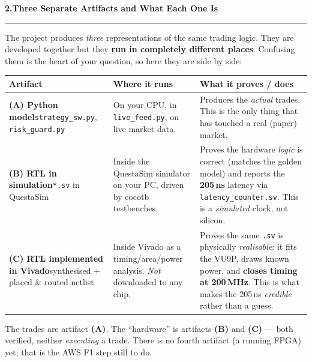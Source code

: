 \documentclass[10pt,a4paper]{article}
\newcommand{\sectionrule}{\par\nobreak\vspace{1pt}\textcolor{rulegray}{\rule{\linewidth}{0.8pt}}\par\vspace{1pt}}
\newcommand{\fpath}[1]{\texttt{\textcolor{hdrblue}{#1}}}
\begin{document}
{\large\bfseries\color{hdrblue} 2.\quad Three Separate Artifacts \textendash{} and What Each One Is}
\sectionrule

The project produces \emph{three} representations of the same trading logic. They
are developed together but they \textbf{run in completely different places}.
Confusing them is the heart of your question, so here they are side by side:

\begin{center}\small
\renewcommand{\arraystretch}{1.3}
\begin{tabularx}{\linewidth}{@{}>{\raggedright\arraybackslash}p{3.0cm} X X@{}}
\toprule
\textbf{Artifact} & \textbf{Where it runs} & \textbf{What it proves / does} \\
\midrule
\textbf{(A) Python model}\newline \fpath{strategy\_sw.py}, \fpath{risk\_guard.py}
  & On your CPU, in \fpath{live\_feed.py}, on live market data.
  & Produces the \emph{actual} trades. This is the only thing that has touched a real (paper) market. \\
\textbf{(B) RTL in simulation}\newline \fpath{*.sv} in QuestaSim
  & Inside the QuestaSim simulator on your PC, driven by cocotb testbenches.
  & Proves the hardware \emph{logic} is correct (matches the golden model) and reports the \textbf{205\,ns} latency via \fpath{latency\_counter.sv}. This is a \emph{simulated} clock, not silicon. \\
\textbf{(C) RTL implemented in Vivado}\newline synthesised + placed \& routed netlist
  & Inside Vivado as a timing/area/power analysis. \emph{Not} downloaded to any chip.
  & Proves the same \texttt{.sv} is physically \emph{realisable}: it fits the VU9P, draws known power, and \textbf{closes timing at 200\,MHz}. This is what makes the 205\,ns \emph{credible} rather than a guess. \\
\bottomrule
\end{tabularx}
\end{center}

\begin{keybox}
The trades are artifact \textbf{(A)}. The ``hardware'' is artifacts \textbf{(B)}
and \textbf{(C)} --- both verified, neither \emph{executing} a trade. There is no
fourth artifact (a running FPGA) yet; that is the AWS F1 step still to do.
\end{keybox}
\end{document}
